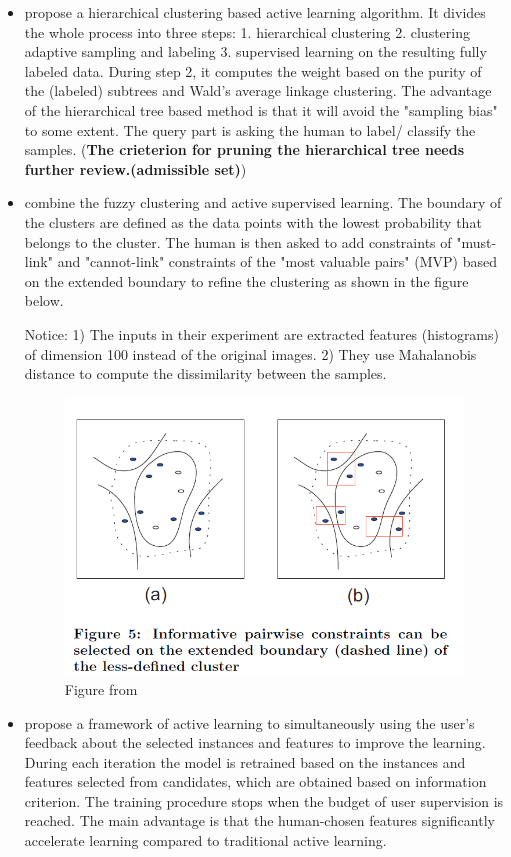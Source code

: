 \documentclass[12pt]{article}
\begin{document}
\begin{itemize}
\item \cite{dasgupta_hierarchical_2008} propose a hierarchical clustering based active learning algorithm. It divides the whole process into three steps: 1. hierarchical clustering 2. clustering adaptive sampling and labeling 3. supervised learning on the resulting fully labeled data. During step 2, it computes the weight based on the purity of the (labeled) subtrees and Wald's average linkage clustering. The advantage of the hierarchical tree based method is that it will avoid the "sampling bias" to some extent. The query part is asking the human to label/ classify the samples. (\textbf{The crieterion for pruning the hierarchical tree needs further review.(admissible set)})

\item \cite{grira_active_2005} combine the fuzzy clustering and active supervised learning. The boundary of the clusters are defined as the data points with the lowest probability that belongs to the cluster. The human is then asked to add constraints of "must-link" and "cannot-link" constraints of the "most valuable pairs" (MVP) based on the extended boundary to refine the clustering as shown in the figure below.

Notice: 1) The inputs in their experiment are extracted features (histograms) of dimension 100 instead of the original images. 2) They use Mahalanobis distance to compute the dissimilarity between the samples.
\begin{figure}[H]
	\centering
	\includegraphics[width=0.7\linewidth]{mvp}
	\caption{Figure from \cite{grira_active_2005}}
	\label{fig:mvp}
\end{figure}

\item \cite{raghavan2006active} propose a framework of active learning to simultaneously using the user's feedback about the selected instances and features to improve the learning. During each iteration the model is retrained based on the instances and features selected from candidates, which are obtained based on information criterion. The training procedure stops when the budget of user supervision is reached. The main advantage is that the human-chosen features significantly accelerate learning compared to traditional active learning. 
\end{itemize}


\end{document}
